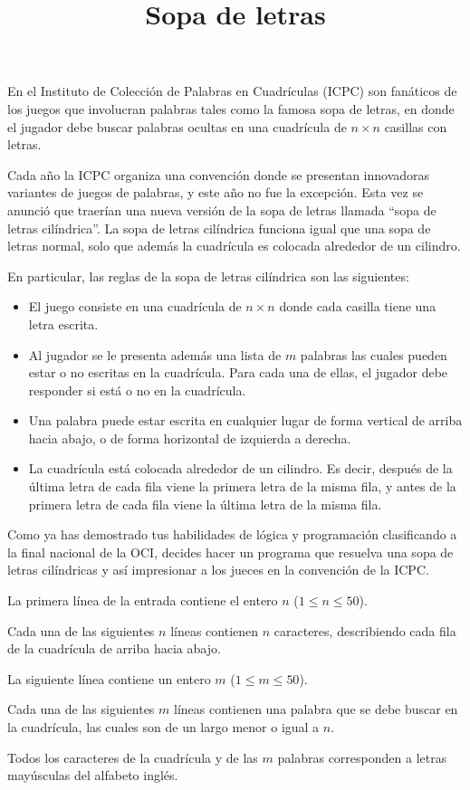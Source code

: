 \documentclass{oci}
\title{Sopa de letras}
\begin{document}
\begin{problemDescription}
  En el Instituto de Colección de Palabras en Cuadrículas (ICPC) son fanáticos de los juegos que
  involucran palabras tales como la famosa sopa de letras, en donde el jugador debe buscar palabras
  ocultas en una cuadrícula de $n \times n$ casillas con letras.

  Cada año la ICPC organiza una convención donde se presentan innovadoras variantes de juegos de palabras,
  y este año no fue la excepción. Esta vez se anunció que traerían una nueva versión de 
  la sopa de letras llamada ``sopa de letras cilíndrica''. La sopa de letras cilíndrica funciona igual
  que una sopa de letras normal, solo que además la cuadrícula es colocada alrededor de un cilindro.

  En particular, las reglas de la sopa de letras cilíndrica son las siguientes:
  \begin{itemize}
    \item El juego consiste en una cuadrícula de $n \times n$ donde cada casilla tiene una letra
      escrita.
    \item Al jugador se le presenta además una lista de $m$ palabras las cuales pueden estar o no
      escritas en la cuadrícula. Para cada una de ellas, el jugador debe responder si está o no
      en la cuadrícula.
    \item Una palabra puede estar escrita en cualquier lugar de forma vertical de arriba hacia abajo, 
      o de forma horizontal de izquierda a derecha.
    \item La cuadrícula está colocada alrededor de un cilindro. Es decir, después de la última letra
      de cada fila viene la primera letra de la misma fila, y antes de la primera letra de cada fila
      viene la última letra de la misma fila.
  \end{itemize}

  Como ya has demostrado tus habilidades de lógica y programación clasificando a la final nacional de la OCI,
  decides hacer un programa que resuelva una sopa de letras cilíndricas y así impresionar a los jueces en la
  convención de la ICPC.
\end{problemDescription}

\begin{inputDescription}
  La primera línea de la entrada contiene el entero $n$ ($1 \leq n \leq 50$). 

  Cada una de las siguientes $n$ líneas contienen $n$ caracteres, describiendo
  cada fila de la cuadrícula de arriba hacia abajo.

  La siguiente línea contiene un entero $m$ ($1 \leq m \leq 50$).

  Cada una de las siguientes $m$ líneas contienen una palabra que se debe
  buscar en la cuadrícula, las cuales son de un largo menor o igual a $n$.

  Todos los caracteres de la cuadrícula y de las $m$ palabras corresponden a letras mayúsculas
  del alfabeto inglés.
\end{inputDescription}
\end{document}
